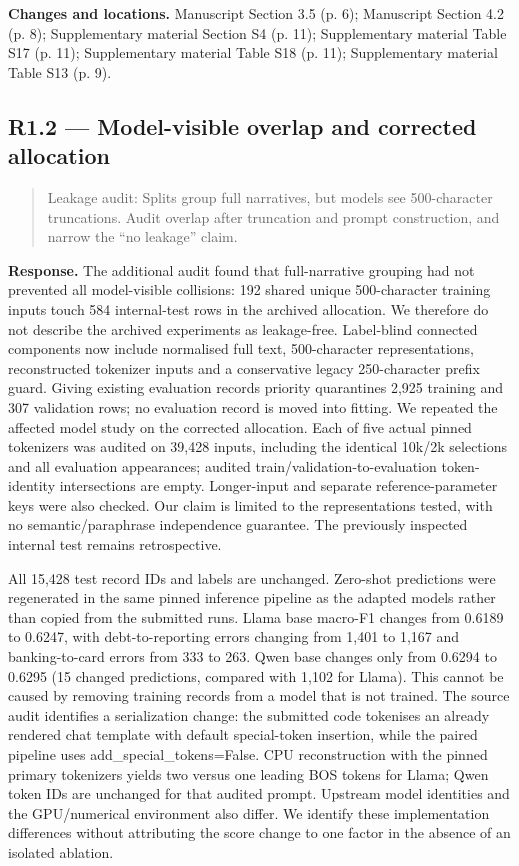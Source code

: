 \documentclass[11pt,a4paper]{article}
\begin{document}
\textbf{Changes and locations.} Manuscript Section 3.5 (p. 6); Manuscript Section 4.2 (p. 8); Supplementary material Section S4 (p. 11); Supplementary material Table S17 (p. 11); Supplementary material Table S18 (p. 11); Supplementary material Table S13 (p. 9).

\subsection*{R1.2 — Model-visible overlap and corrected allocation}
\begin{quote}\small Leakage audit: Splits group full narratives, but models see 500-character truncations. Audit overlap after truncation and prompt construction, and narrow the “no leakage” claim.\end{quote}
\textbf{Response.} The additional audit found that full-narrative grouping had not prevented all model-visible collisions: 192 shared unique 500-character training inputs touch 584 internal-test rows in the archived allocation. We therefore do not describe the archived experiments as leakage-free. Label-blind connected components now include normalised full text, 500-character representations, reconstructed tokenizer inputs and a conservative legacy 250-character prefix guard. Giving existing evaluation records priority quarantines 2,925 training and 307 validation rows; no evaluation record is moved into fitting. We repeated the affected model study on the corrected allocation. Each of five actual pinned tokenizers was audited on 39,428 inputs, including the identical 10k/2k selections and all evaluation appearances; audited train/validation-to-evaluation token-identity intersections are empty. Longer-input and separate reference-parameter keys were also checked. Our claim is limited to the representations tested, with no semantic/paraphrase independence guarantee. The previously inspected internal test remains retrospective.

All 15,428 test record IDs and labels are unchanged. Zero-shot predictions were regenerated in the same pinned inference pipeline as the adapted models rather than copied from the submitted runs. Llama base macro-F1 changes from 0.6189 to 0.6247, with debt-to-reporting errors changing from 1,401 to 1,167 and banking-to-card errors from 333 to 263. Qwen base changes only from 0.6294 to 0.6295 (15 changed predictions, compared with 1,102 for Llama). This cannot be caused by removing training records from a model that is not trained. The source audit identifies a serialization change: the submitted code tokenises an already rendered chat template with default special-token insertion, while the paired pipeline uses add\_special\_tokens=False. CPU reconstruction with the pinned primary tokenizers yields two versus one leading BOS tokens for Llama; Qwen token IDs are unchanged for that audited prompt. Upstream model identities and the GPU/numerical environment also differ. We identify these implementation differences without attributing the score change to one factor in the absence of an isolated ablation.
\end{document}
